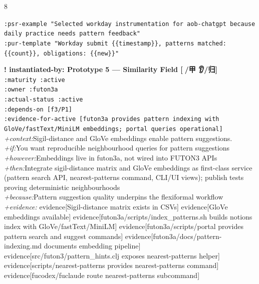 \documentclass[landscape]{article}
\newcommand{\flexitag}[1]{\textcolor[gray]{0.35}{\textit{#1}}}
\newenvironment{devmapactive}{%
  \def\FrameCommand{\colorbox{devmapactivebg}}%
  \setlength{\fboxsep}{2pt}%
  \MakeFramed{\advance\hsize-\width \FrameRestore}%
}{\endMakeFramed}
\begin{document}
\begin{paracol}{8}
\begin{devmapactive}
\par
  \texttt{:\allowbreak{}psr-\allowbreak{}example "Selected workday instrumentation for aob-\allowbreak{}chatgpt because daily practice needs pattern feedback"}\\
  \texttt{:\allowbreak{}pur-\allowbreak{}template "Workday submit \{\{timestamp\}\},\allowbreak{} patterns matched:\allowbreak{} \{\{count\}\},\allowbreak{} obligations:\allowbreak{} \{\{new\}\}"}\\
\par
\par
\end{devmapactive}
\begin{devmapactive}
\textbf{! instantiated-by: Prototype 5 — Similarity Field [🌂/甲 👂/归]}\\
  \texttt{:\allowbreak{}maturity :\allowbreak{}active}\\
  \texttt{:\allowbreak{}owner :\allowbreak{}futon3a}\\
  \texttt{:\allowbreak{}actual-\allowbreak{}status :\allowbreak{}active}\\
  \texttt{:\allowbreak{}depends-\allowbreak{}on [f3/\allowbreak{}P1]}\\
  \texttt{:\allowbreak{}evidence-\allowbreak{}for-\allowbreak{}active [futon3a provides pattern indexing with GloVe/\allowbreak{}fastText/\allowbreak{}MiniLM embeddings;\allowbreak{} portal queries operational]}\\
  \flexitag{+context:}Sigil-distance and GloVe embeddings enable pattern suggestions.\\
  \flexitag{+if:}You want reproducible neighbourhood queries for pattern suggestions\\
  \flexitag{+however:}Embeddings live in futon3a, not wired into FUTON3 APIs\\
  \flexitag{+then:}Integrate sigil-distance matrix and GloVe embeddings as first-class service (pattern search API, nearest-patterns command, CLI/UI views); publish tests proving deterministic neighbourhoods\\
  \flexitag{+because:}Pattern suggestion quality underpins the flexiformal workflow\\
  \flexitag{+evidence:} evidence[Sigil-distance matrix exists in CSVs] evidence[GloVe embeddings available] evidence[futon3a/scripts/index\_patterns.sh builds notions index with GloVe/fastText/MiniLM] evidence[futon3a/scripts/portal provides pattern search and suggest commands] evidence[futon3a/docs/pattern-indexing.md documents embedding pipeline] evidence[src/futon3/pattern\_hints.clj exposes nearest-patterns helper] evidence[scripts/nearest-patterns provides nearest-patterns command] evidence[fucodex/fuclaude route nearest-patterns subcommand]\\

\end{devmapactive}
\end{paracol}
\end{document}
